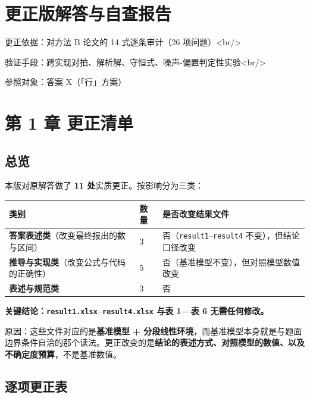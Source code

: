 
\section{更正版解答与自查报告}



更正依据：对方法 B 论文的 14 式逐条审计（26 项问题）<br/>

验证手段：跨实现对拍、解析解、守恒式、噪声-偏置判定性实验<br/>

参照对象：答案 X（「行」方案）



\section{第 1 章 更正清单}


\subsection{总览}


本版对原解答做了 \textbf{11 处}实质更正。按影响分为三类：


\begin{center}
\small
\begin{tabular}{lll}
\toprule
类别 & 数量 & 是否改变结果文件 \\
\midrule
\textbf{答案表述类}（改变最终报出的数与区间） & 3 & 否（\texttt{result1}–\texttt{result4} 不变），但结论口径改变 \\
\textbf{推导与实现类}（改变公式与代码的正确性） & 5 & 否（基准模型不变），但对照模型数值改变 \\
\textbf{表述与规范类} & 3 & 否 \\
\bottomrule
\end{tabular}
\end{center}


\textbf{关键结论：\texttt{result1.xlsx}–\texttt{result4.xlsx} 与表 1—表 6 无需任何修改。}


原因：这些文件对应的是\textbf{基准模型 + 分段线性环境}，而基准模型本身就是与题面边界条件自洽的那个读法。更正改变的是\textbf{结论的表述方式、对照模型的数值、以及不确定度预算}，不是基准数值。


\subsection{逐项更正表}


